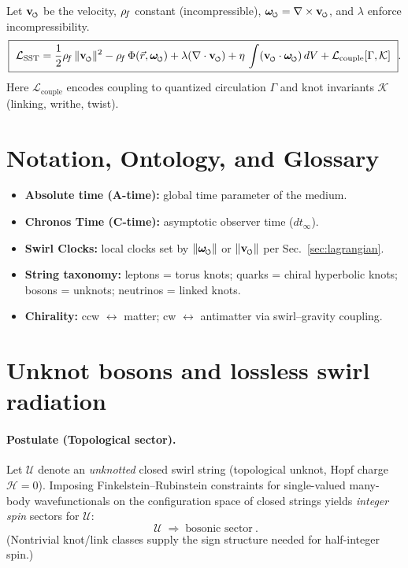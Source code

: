 \documentclass[11pt]{article}
\begin{document}
    Let $\vswirl$ be the velocity, $\rho_{\!f}$ constant (incompressible), $\omegas=\nabla\times\vswirl$, and $\lambda$ enforce incompressibility.
    \[
        \boxed{\
        \mathcal{L}_{\text{SST}} =
            \frac{1}{2}\rhof\,\lVert\vswirl\rVert^{2}
            - \rhof\,\Phi(\vec r,\omegas)
            + \lambda(\nabla\cdot\vswirl)
            + \eta\,\int (\vswirl\cdot\omegas)\,dV
            + \mathcal{L}_{\text{couple}}[\Gamma,\mathcal{K}]
            \ }.
    \]
    Here $\mathcal{L}_{\text{couple}}$ encodes coupling to quantized circulation $\Gamma$ and knot invariants $\mathcal{K}$ (linking, writhe, twist).

    \section{Notation, Ontology, and Glossary}
    \begin{itemize}
        \item \textbf{Absolute time (A-time):} global time parameter of the medium.
        \item \textbf{Chronos Time (C-time):} asymptotic observer time ($dt_{\infty}$).
        \item \textbf{Swirl Clocks:} local clocks set by \(\lVert\omegas\rVert\) or \(\lVert\vswirl\rVert\) per Sec.~\ref{sec:lagrangian}.
        \item \textbf{String taxonomy:} leptons = torus knots; quarks = chiral hyperbolic knots; bosons = unknots; neutrinos = linked knots.
        \item \textbf{Chirality:} ccw $\leftrightarrow$ matter; cw $\leftrightarrow$ antimatter via swirl–gravity coupling.
    \end{itemize}



    \section{Unknot bosons and lossless swirl radiation}

    \paragraph{Postulate (Topological sector).}
    Let $\mathcal U$ denote an \emph{unknotted} closed swirl string (topological unknot, Hopf charge $\mathcal H=0$).
    Imposing Finkelstein--Rubinstein constraints for single-valued many-body wavefunctionals on the configuration space of closed strings yields \emph{integer spin} sectors for $\mathcal U$:
    \[
    \boxed{\ \mathcal U \;\Rightarrow\; \text{bosonic sector}\ }.
    \]
    (Nontrivial knot/link classes supply the sign structure needed for half-integer spin.)~\cite{FinkelsteinRubinstein1968}
\end{document}
